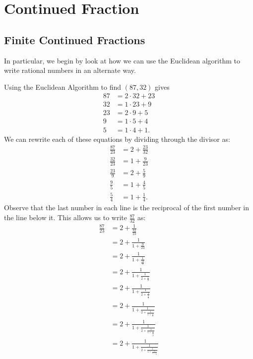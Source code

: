 \section{Continued Fraction}
\subsection*{Finite Continued Fractions}
In particular, we begin by look at how we can use the Euclidean algorithm
to write rational numbers in an alternate way.
\begin{Example}{}{}
    Using the Euclidean Algorithm to find $ (87,32) $
    gives
    \begin{align*}
        87 & =2\cdot 32+23 \\
        32 & =1\cdot 23+9  \\
        23 & =2\cdot 9+5   \\
        9  & =1\cdot 5+4   \\
        5  & =1\cdot 4+1.
    \end{align*}
    We can rewrite each of these equations by dividing through
    the divisor as:
    \begin{align*}
        \frac{87}{23} & =2+\frac{23}{32} \\
        \frac{32}{23} & =1+\frac{9}{23}  \\
        \frac{23}{9}  & =2+\frac{5}{9}   \\
        \frac{9}{5}   & =1+\frac{4}{5}   \\
        \frac{5}{4}   & =1+\frac{1}{4}.
    \end{align*}
    Observe that the last number in each line is the
    reciprocal of the first number in the line below it.
    This allows us to write $ \frac{87}{32} $ as:
    \begin{align*}
        \frac{87}{23}
         & =2+\frac{1}{\frac{32}{23}}                                     \\
         & =2+\frac{1}{1+\frac{9}{23}}                                    \\
         & =2+\frac{1}{1+\frac{1}{\frac{23}{9}}}                          \\
         & =2+\frac{1}{1+\frac{1}{2+\frac{5}{9}}}                         \\
         & =2+\frac{1}{1+\frac{1}{2+\frac{1}{\frac{9}{5}}}}               \\
         & =2+\frac{1}{1+\frac{1}{2+\frac{1}{1+\frac{4}{5}}}}             \\
         & =2+\frac{1}{1+\frac{1}{2+\frac{1}{1+\frac{1}{\frac{5}{4}}}}}   \\
         & =2+\frac{1}{1+\frac{1}{2+\frac{1}{1+\frac{1}{1+\frac{1}{4}}}}} \\
    \end{align*}
\end{Example}
